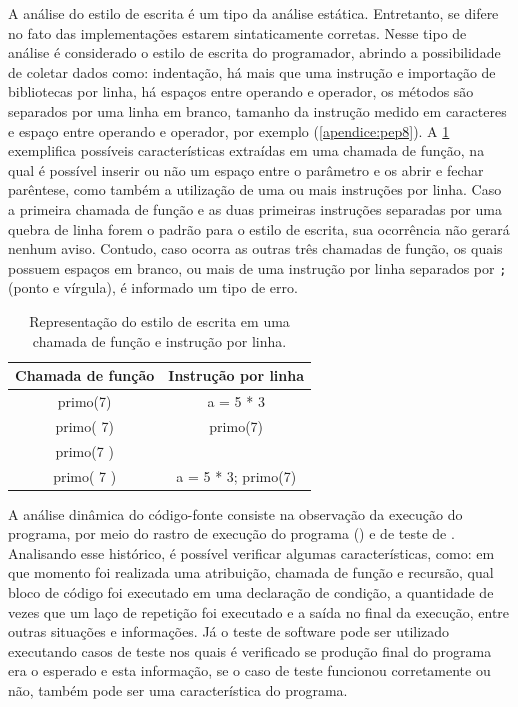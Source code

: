 			A análise do estilo de escrita é um tipo da análise estática. Entretanto,
			se difere no fato das implementações estarem sintaticamente corretas. Nesse
			tipo de análise é considerado o estilo de escrita do programador, abrindo a
			possibilidade de coletar dados como: indentação, há mais que uma instrução e importação
			de bibliotecas por linha, há espaços entre operando e operador, os métodos
			são separados por uma linha em branco, tamanho da instrução  medido em
			caracteres e espaço entre operando e operador, por exemplo (\cref{apendice:pep8}).
			A \cref{tab:exemploEstEsc} exemplifica possíveis características
			extraídas em uma chamada de função, na qual é possível inserir ou não um
			espaço entre o parâmetro e os  abrir e fechar parêntese,
			como também a utilização de uma ou mais instruções por linha. Caso a primeira
			chamada de função e as duas primeiras instruções separadas por uma quebra de linha
			forem o padrão para o estilo de escrita, sua ocorrência não gerará nenhum
			aviso. Contudo, caso ocorra as outras três chamadas de função, os quais
			possuem espaços em branco, ou mais de uma instrução por linha separados
			por \texttt{;} (ponto e vírgula), é informado um tipo de erro.
			
			\begin{table}
				\centering
				\begin{tabular}{|c|c|}
					\hline
					Chamada de função & Instrução por linha \\ \hline
					primo(7)		  & a = 5 * 3  \\
					primo( 7)		 & primo(7)	 \\
					primo(7 )		 &	  \\
					primo( 7 )		& a = 5 * 3; primo(7)	\\
					\hline
				\end{tabular}
				\caption[Representação do estilo de escrita]{Representação do estilo
				de escrita em uma chamada de função e instrução por linha.}
				\label{tab:exemploEstEsc}
			\end{table}
			
			A análise dinâmica do código-fonte consiste na observação da execução do
			programa, por meio do rastro de execução do programa
			() e de teste de . Analisando esse histórico, é
			possível verificar algumas características, como: em que momento foi realizada
			uma atribuição, chamada de função e recursão, qual bloco de código foi
			executado em uma declaração de condição, a quantidade de vezes que um laço
			de repetição foi executado e a saída no final da execução, entre outras situações
			e informações. Já o teste de
			software pode ser utilizado executando casos de teste nos quais é verificado
			se produção final do programa era o esperado e esta informação, se o caso de
			teste funcionou corretamente ou não, também pode ser uma característica do programa.
			
